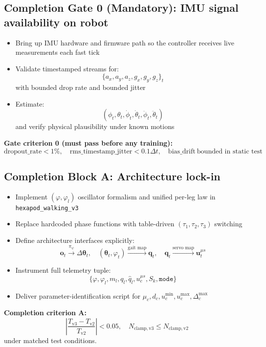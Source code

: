 \documentclass[11pt]{article}
\begin{document}
\subsection*{Completion Gate 0 (Mandatory): IMU signal availability on robot}
\begin{itemize}
    \item Bring up IMU hardware and firmware path so the controller receives live measurements each fast tick
    \item Validate timestamped streams for:
    \[
    \{a_x,a_y,a_z,g_x,g_y,g_z\}_t
    \]
    with bounded drop rate and bounded jitter
    \item Estimate:
    \[
    (\phi_t,\theta_t,\dot{\phi}_t,\dot{\theta}_t,\ddot{\phi}_t,\ddot{\theta}_t)
    \]
    and verify physical plausibility under known motions
\end{itemize}
\textbf{Gate criterion 0 (must pass before any training):}
\[
\mathrm{dropout\_rate}<1\%,\quad
\mathrm{rms\_timestamp\_jitter}<0.1\Delta t,\quad
\mathrm{bias\_drift}\ \text{bounded in static test}
\]

\subsection*{Completion Block A: Architecture lock-in}
\begin{itemize}
    \item Implement $(\varphi,\varphi_l)$ oscillator formalism and unified per-leg law in \texttt{hexapod\_walking\_v3}
    \item Replace hardcoded phase functions with table-driven $(\tau_1,\tau_2,\tau_3)$ switching
    \item Define architecture interfaces explicitly:
    \[
    \mathbf{o}_t \xrightarrow{\pi_{\psi}} \Delta\boldsymbol{\theta}_t,\quad
    (\boldsymbol{\theta}_t,\varphi_t)\xrightarrow{\text{gait map}} \mathbf{q}_t,\quad
    \mathbf{q}_t\xrightarrow{\text{servo map}} \mathbf{u}^{\mu s}_t
    \]
    \item Instrument full telemetry tuple:
    \[
    \{\varphi,\varphi_l,m_l,q_l,\hat{q}_l,u^{\mu s}_{c},S_k,\texttt{mode}\}
    \]
    \item Deliver parameter-identification script for $\mu_c,d_c,u^{\min}_c,u^{\max}_c,\Delta_c^{\max}$
\end{itemize}
\textbf{Completion criterion A:}
\[
\left|\frac{T_{\mathrm{v3}}-T_{\mathrm{v2}}}{T_{\mathrm{v2}}}\right|<0.05,\quad
N_{\mathrm{clamp,v3}}\le N_{\mathrm{clamp,v2}}
\]
under matched test conditions.
\end{document}
